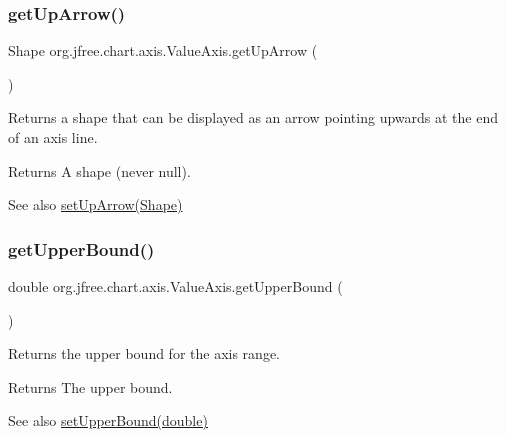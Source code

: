 \subsubsection{\texorpdfstring{get\+Up\+Arrow()}{getUpArrow()}}
{\footnotesize\ttfamily Shape org.\+jfree.\+chart.\+axis.\+Value\+Axis.\+get\+Up\+Arrow (\begin{DoxyParamCaption}{ }\end{DoxyParamCaption})}

Returns a shape that can be displayed as an arrow pointing upwards at the end of an axis line.

\begin{DoxyReturn}{Returns}
A shape (never {\ttfamily null}).
\end{DoxyReturn}
\begin{DoxySeeAlso}{See also}
\mbox{\hyperlink{classorg_1_1jfree_1_1chart_1_1axis_1_1_value_axis_ab951a2ddff08bc090fc5b9ea4291aa8c}{set\+Up\+Arrow(\+Shape)}} 
\end{DoxySeeAlso}
\mbox{\label{classorg_1_1jfree_1_1chart_1_1axis_1_1_value_axis_a392f4637b486698032128b77a85cbf3e}} 
\subsubsection{\texorpdfstring{get\+Upper\+Bound()}{getUpperBound()}}
{\footnotesize\ttfamily double org.\+jfree.\+chart.\+axis.\+Value\+Axis.\+get\+Upper\+Bound (\begin{DoxyParamCaption}{ }\end{DoxyParamCaption})}

Returns the upper bound for the axis range.

\begin{DoxyReturn}{Returns}
The upper bound.
\end{DoxyReturn}
\begin{DoxySeeAlso}{See also}
\mbox{\hyperlink{classorg_1_1jfree_1_1chart_1_1axis_1_1_value_axis_ab2872c6051cab2e55611cd85ef3baabb}{set\+Upper\+Bound(double)}} 
\end{DoxySeeAlso}
\mbox{\label{classorg_1_1jfree_1_1chart_1_1axis_1_1_value_axis_a643d075d5cce4ad54ce8274b8b2d38a8}} 
